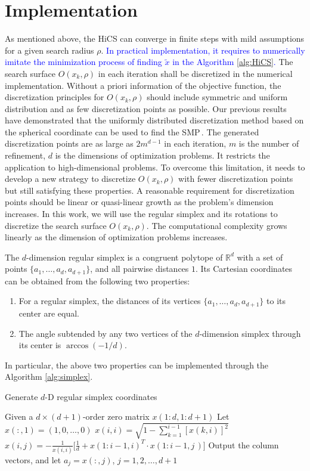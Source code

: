 \documentclass[mathpazo]{csam}
\theoremstyle{remark}
\begin{document}
\section{Implementation}
\label{sec:implement}

As mentioned above, the HiCS can converge in  
finite steps with mild assumptions for a given search radius $\rho$.
\textcolor{blue}{
In practical implementation, it requires to numerically imitate the minimization
process of finding $\tilde{x}$ in the Algorithm \ref{alg:HiCS}.
}
The search surface $O(x_k,\rho)$ in
each iteration shall be discretized in the numerical implementation.
Without a priori information of the objective function,
the discretization principles for $O(x_k,\rho)$
should include symmetric and uniform distribution and as few discretization points as possible.
Our previous results have demonstrated that the uniformly distributed
discretization method based on the spherical coordinate
can be used to find the SMP\,\cite{huang2017hill}. 
The generated discretization points are as large as $2m^{d-1}$ in
each iteration, $m$ is the number of refinement, $d$ is the dimensions of
optimization problems. It restricts the
application to high-dimensional problems. 
To overcome this limitation, it needs to develop a new
strategy to discretize $O(x_k,\rho)$ with fewer discretization points
but still satisfying these properties.
A reasonable requirement for discretization points should be
linear or quasi-linear growth as the problem's dimension increases.
In this work, we will use the regular simplex and its rotations to
discretize the search surface $O(x_k,\rho)$. 
The computational complexity grows linearly as the
dimension of optimization problems increases.

The $d$-dimension regular simplex is a congruent polytope of
$\mathbb{R}^d$ with a set of points $\{a_1,\dots,a_d,a_{d+1}\}$,
and all pairwise distances $1$.
Its Cartesian coordinates can be obtained from the following two properties:
\begin{enumerate}
	\item For a regular simplex, the distances of its vertices 
		$\{a_1,\dots,a_d,a_{d+1}\}$ to its center are equal.
	\item The angle subtended by any two vertices of the 
		$d$-dimension simplex through its center is
		$\arccos(-1/d)$.
\end{enumerate}
In particular, the above two properties can be implemented
through the Algorithm \ref{alg:simplex}.
\begin{algorithm}[!htpb]
	\caption{Generate $d$-D regular simplex coordinates} 
	\label{alg:simplex}
\begin{algorithmic}
	\STATE Given a $d\times(d+1)$-order zero matrix $x(1:d,1:d+1)$
	\STATE Let $x(:,1) = (1,0,\dots,0)$
	\STATE $x(i,i)=\sqrt{1-\sum_{k=1}^{i-1} [x(k, i)]^{2}}$
		\STATE $x(i,j)
		=-\frac{1}{x(i,i)}\Big[\frac{1}{d}+x(1:i-1, i)^T \cdot
		x(1:i-1, j\,)\Big]$
		\ENDFOR
	\ENDFOR
	\STATE Output the column vectors, and let $a_j=x(:,j)$,
	$j=1,2,\dots,d+1$ 
\end{algorithmic}
\end{algorithm}
\end{document}
